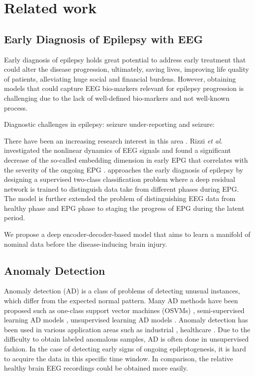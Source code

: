 \documentclass[pmlr]{jmlr}%
\begin{document}
\section{Related work}
\subsection{Early Diagnosis of Epilepsy with EEG}
Early diagnosis of epilepsy holds great potential to address early treatment that could alter the disease progression, ultimately, saving lives, improving life quality of patients, alleviating huge social and financial burdens. However, obtaining models that could capture EEG bio-markers relevant for epilepsy progression is challenging due to the lack of well-defined bio-markers and not well-known process. 

\cite{ELGER2018279} Diagnostic challenges in epilepsy: seizure under-reporting and seizure: 


There have been an increasing research interest in this area \cite{lu2020towards, lu2020staging, rizzi2019changes}. Rizzi \textit{et al.} investigated the nonlinear dynamics of EEG signals and found a significant decrease of the so-called embedding dimension in early EPG that correlates with the severity of the ongoing EPG \cite{rizzi2019changes}.
\cite{lu2020towards} approaches the early diagnosis of epilepsy by designing a supervised two-class classification problem where a deep residual network is trained to distinguish data take from different phases during EPG. The model is 
\cite{lu2020staging} further extended the problem of distinguishing EEG data from healthy phase and EPG phase to staging the progress of EPG during the latent period.

We propose a deep encoder-decoder-based model that aims to learn a manifold of nominal data before the disease-inducing brain injury.


\subsection{Anomaly Detection}
Anomaly detection (AD) is a class of problems of detecting unusual instances, which differ from the expected normal pattern. Many AD methods have been proposed such as one-class support vector machines (OSVMs) \cite{scholkopf2001estimating, tax2004suppor}, semi-supervised learning AD models \cite{ruff2019deep}, unsupervised learning AD models \cite{bibid}. Anomaly detection has been used in various application areas such as industrial \cite{bibid}, healthcare \cite{bibid}. Due to the difficulty to obtain labeled anomalous samples, AD is often done in unsupervised fashion. 
In the case of detecting early signs of ongoing epileptogenesis, it is hard to acquire the data in this specific time window. In comparison, the relative healthy brain EEG recordings could be obtained more easily.
\end{document}
